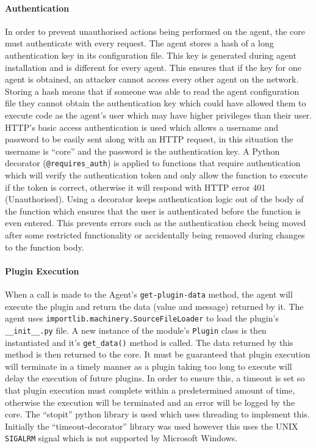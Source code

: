 \documentclass[bsc,logo,twoside,parskip,singlespacing,notimes]{infthesis}
\begin{document}
\paragraph*{Authentication}
	In order to prevent unauthorised actions being performed on the agent, the core
	must authenticate with every request.  The agent stores a hash of a long
	authentication key in its configuration file. This key is generated during agent
	installation and is different for every agent. This ensures that if the key for
	one agent is obtained, an attacker cannot access every other agent on the
	network. Storing a hash means that if someone was able to read the agent
	configuration file they cannot obtain the authentication key which could have
	allowed them to execute code as the agent's user which may have higher
	privileges than their user. HTTP's basic access authentication is used which
	allows a username and password to be easily sent along with an HTTP request, in
	this situation the username is ``core'' and the password is the authentication
	key.  A Python decorator (\texttt{@requires\_auth}) is applied to functions
	that require authentication which will verify the authentication token and only
	allow the function to execute if the token is correct, otherwise it will
	respond with HTTP error 401 (Unauthorised). Using a decorator keeps
	authentication logic out of the body of the function which ensures that the
	user is authenticated before the function is even entered.  This prevents
	errors such as the authentication check being moved after some restricted
	functionality or accidentally being removed during changes to the function
	body.
	
\paragraph*{Plugin Execution}
	When a call is made to the Agent's \texttt{get-plugin-data} method, the agent
	will execute the plugin and return the data (value and message) returned by it.
	The agent uses \texttt{importlib.machinery.SourceFileLoader} to load the
	plugin's \texttt{\_\_init\_\_.py} file.  A new instance of the module's
	\texttt{Plugin} class is then instantiated and it's \texttt{get\_data()} method
	is called.  The data returned by this method is then returned to the core.
	It must be guaranteed that plugin execution will terminate in a timely manner
	as a plugin taking too long to execute will delay the execution of future
	plugins.  In order to ensure this, a timeout is set so that plugin execution 
	must complete within a predetermined amount of time, otherwise the execution
	will be terminated and an error will be logged by the core. The ``stopit''
	python library is used which uses threading to implement this.  Initially
	the ``timeout-decorator'' library was used however this uses the UNIX
	\texttt{SIGALRM} signal which is not supported by Microsoft Windows.
\end{document}
